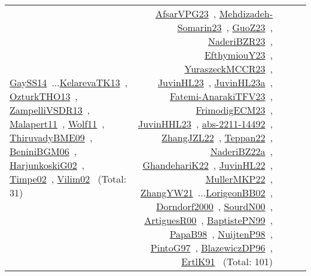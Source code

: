 {\begin{longtable}{p{3cm}r>{\raggedright\arraybackslash}p{6cm}>{\raggedright\arraybackslash}p{6cm}>{\raggedright\arraybackslash}p{8cm}}
\href{../works/GaySS14.pdf}{GaySS14}~\cite{GaySS14}...\href{../works/KelarevaTK13.pdf}{KelarevaTK13}~\cite{KelarevaTK13}, \href{../works/OzturkTHO13.pdf}{OzturkTHO13}~\cite{OzturkTHO13}, \href{../works/ZampelliVSDR13.pdf}{ZampelliVSDR13}~\cite{ZampelliVSDR13}, \href{../works/Malapert11.pdf}{Malapert11}~\cite{Malapert11}, \href{../works/Wolf11.pdf}{Wolf11}~\cite{Wolf11}, \href{../works/ThiruvadyBME09.pdf}{ThiruvadyBME09}~\cite{ThiruvadyBME09}, \href{../works/BeniniBGM06.pdf}{BeniniBGM06}~\cite{BeniniBGM06}, \href{../works/HarjunkoskiG02.pdf}{HarjunkoskiG02}~\cite{HarjunkoskiG02}, \href{../works/Timpe02.pdf}{Timpe02}~\cite{Timpe02}, \href{../works/Vilim02.pdf}{Vilim02}~\cite{Vilim02} (Total: 31) & \href{../works/AfsarVPG23.pdf}{AfsarVPG23}~\cite{AfsarVPG23}, \href{../works/Mehdizadeh-Somarin23.pdf}{Mehdizadeh-Somarin23}~\cite{Mehdizadeh-Somarin23}, \href{../works/GuoZ23.pdf}{GuoZ23}~\cite{GuoZ23}, \href{../works/NaderiBZR23.pdf}{NaderiBZR23}~\cite{NaderiBZR23}, \href{../works/EfthymiouY23.pdf}{EfthymiouY23}~\cite{EfthymiouY23}, \href{../works/YuraszeckMCCR23.pdf}{YuraszeckMCCR23}~\cite{YuraszeckMCCR23}, \href{../works/JuvinHL23.pdf}{JuvinHL23}~\cite{JuvinHL23}, \href{../works/JuvinHL23a.pdf}{JuvinHL23a}~\cite{JuvinHL23a}, \href{../works/Fatemi-AnarakiTFV23.pdf}{Fatemi-AnarakiTFV23}~\cite{Fatemi-AnarakiTFV23}, \href{../works/FrimodigECM23.pdf}{FrimodigECM23}~\cite{FrimodigECM23}, \href{../works/JuvinHHL23.pdf}{JuvinHHL23}~\cite{JuvinHHL23}, \href{../works/abs-2211-14492.pdf}{abs-2211-14492}~\cite{abs-2211-14492}, \href{../works/ZhangJZL22.pdf}{ZhangJZL22}~\cite{ZhangJZL22}, \href{../works/Teppan22.pdf}{Teppan22}~\cite{Teppan22}, \href{../works/NaderiBZ22a.pdf}{NaderiBZ22a}~\cite{NaderiBZ22a}, \href{../works/GhandehariK22.pdf}{GhandehariK22}~\cite{GhandehariK22}, \href{../works/JuvinHL22.pdf}{JuvinHL22}~\cite{JuvinHL22}, \href{../works/MullerMKP22.pdf}{MullerMKP22}~\cite{MullerMKP22}, \href{../works/ZhangYW21.pdf}{ZhangYW21}~\cite{ZhangYW21}...\href{../works/LorigeonBB02.pdf}{LorigeonBB02}~\cite{LorigeonBB02}, \href{../works/Dorndorf2000.pdf}{Dorndorf2000}~\cite{Dorndorf2000}, \href{../works/SourdN00.pdf}{SourdN00}~\cite{SourdN00}, \href{../works/ArtiguesR00.pdf}{ArtiguesR00}~\cite{ArtiguesR00}, \href{../works/BaptistePN99.pdf}{BaptistePN99}~\cite{BaptistePN99}, \href{../works/PapaB98.pdf}{PapaB98}~\cite{PapaB98}, \href{../works/NuijtenP98.pdf}{NuijtenP98}~\cite{NuijtenP98}, \href{../works/PintoG97.pdf}{PintoG97}~\cite{PintoG97}, \href{../works/BlazewiczDP96.pdf}{BlazewiczDP96}~\cite{BlazewiczDP96}, \href{../works/ErtlK91.pdf}{ErtlK91}~\cite{ErtlK91} (Total: 101)\\

\end{longtable}}
